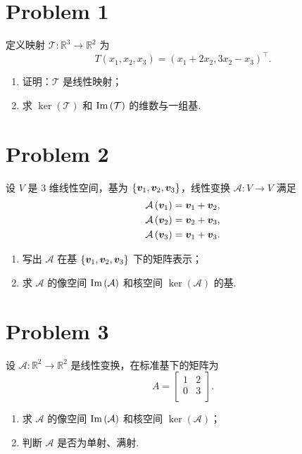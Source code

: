 \section*{Problem 1}

定义映射 $\mathcal{T}: \mathbb{R}^3 \to \mathbb{R}^2$ 为
\[
T \left(x_1, x_2, x_3\right) = \left(x_1 + 2x_2, 3x_2 - x_3\right)^\top.
\]
\begin{enumerate}
    \item 证明：$\mathcal{T}$ 是线性映射；
    \item 求 $\ker \left(\mathcal{T}\right)$ 和 $\mathrm{Im} \left(\mathcal{T}\right)$ 的维数与一组基.
\end{enumerate}

\section*{Problem 2}

设 $V$ 是 3 维线性空间，基为 $\left\{\boldsymbol{v}_1, \boldsymbol{v}_2, \boldsymbol{v}_3\right\}$，线性变换 $\mathcal{A}: V \to V$ 满足
\[
\begin{aligned}
    \mathcal{A} \left(\boldsymbol{v}_1\right) = \boldsymbol{v}_1 + \boldsymbol{v}_2, \\
    \mathcal{A} \left(\boldsymbol{v}_2\right) = \boldsymbol{v}_2 + \boldsymbol{v}_3, \\
    \mathcal{A} \left(\boldsymbol{v}_3\right) = \boldsymbol{v}_1 + \boldsymbol{v}_3. \\
\end{aligned}
\]
\begin{enumerate}
    \item 写出 $\mathcal{A}$ 在基 $\left\{\boldsymbol{v}_1, \boldsymbol{v}_2, \boldsymbol{v}_3\right\}$ 下的矩阵表示；
    \item 求 $\mathcal{A}$ 的像空间 $\mathrm{Im} \left(\mathcal{A}\right)$ 和核空间 $\ker \left(\mathcal{A}\right)$ 的基.
\end{enumerate}

\section*{Problem 3}

设 $\mathcal{A}: \mathbb{R}^2 \to \mathbb{R}^2$ 是线性变换，在标准基下的矩阵为
\[
A = \begin{bmatrix}
    1 & 2 \\
    0 & 3 \\
\end{bmatrix}.
\]
\begin{enumerate}
    \item 求 $\mathcal{A}$ 的像空间 $\mathrm{Im} \left(\mathcal{A}\right)$ 和核空间 $\ker \left(\mathcal{A}\right)$；
    \item 判断 $\mathcal{A}$ 是否为单射、满射.
\end{enumerate}
